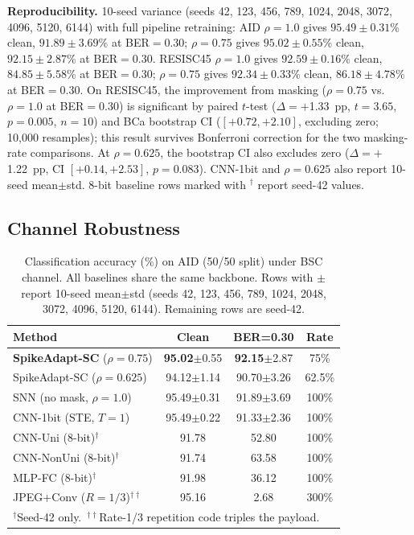 \documentclass[conference]{IEEEtran}
\begin{document}
\textbf{Reproducibility.} 10-seed variance (seeds 42, 123, 456, 789, 1024, 2048, 3072, 4096, 5120, 6144) with full pipeline retraining: AID $\rho{=}1.0$ gives $95.49 \pm 0.31$\% clean, $91.89 \pm 3.69$\% at BER$=$0.30; $\rho{=}0.75$ gives $95.02 \pm 0.55$\% clean, $92.15 \pm 2.87$\% at BER$=$0.30. RESISC45 $\rho{=}1.0$ gives $92.59 \pm 0.16$\% clean, $84.85 \pm 5.58$\% at BER$=$0.30; $\rho{=}0.75$ gives $92.34 \pm 0.33$\% clean, $86.18 \pm 4.78$\% at BER$=$0.30. On RESISC45, the improvement from masking ($\rho{=}0.75$ vs.~$\rho{=}1.0$ at BER$=$0.30) is significant by paired $t$-test ($\Delta{=}+$1.33~pp, $t{=}3.65$, $p{=}0.005$, $n{=}10$) and BCa bootstrap CI ($[+0.72, +2.10]$, excluding zero; 10,000 resamples); this result survives Bonferroni correction for the two masking-rate comparisons. At $\rho{=}0.625$, the bootstrap CI also excludes zero ($\Delta{=}+$1.22~pp, CI $[+0.14, +2.53]$, $p{=}0.083$). CNN-1bit and $\rho{=}0.625$ also report 10-seed mean$\pm$std. 8-bit baseline rows marked with $^\dagger$ report seed-42 values.

\subsection{Channel Robustness}

\begin{table}[t]
\renewcommand{\arraystretch}{1.15}
\centering
\caption{Classification accuracy (\%) on AID (50/50 split) under BSC channel. All baselines share the same backbone. Rows with $\pm$ report 10-seed mean$\pm$std (seeds 42, 123, 456, 789, 1024, 2048, 3072, 4096, 5120, 6144). Remaining rows are seed-42.}
\label{tab:main_results}
\begin{tabular}{l c c c}
\toprule
\textbf{Method} & \textbf{Clean} & \textbf{BER=0.30} & \textbf{Rate} \\
\midrule
\textbf{SpikeAdapt-SC} ($\rho{=}0.75$) & \textbf{95.02}{\scriptsize$\pm$0.55} & \textbf{92.15}{\scriptsize$\pm$2.87} & 75\% \\
SpikeAdapt-SC ($\rho{=}0.625$) & 94.12{\scriptsize$\pm$1.14} & 90.70{\scriptsize$\pm$3.26} & 62.5\% \\
SNN (no mask, $\rho{=}1.0$) & 95.49{\scriptsize$\pm$0.31} & 91.89{\scriptsize$\pm$3.69} & 100\% \\
CNN-1bit (STE, $T{=}1$) & 95.49{\scriptsize$\pm$0.22} & 91.33{\scriptsize$\pm$2.36} & 100\% \\
\midrule
CNN-Uni (8-bit)$^\dagger$ & 91.78 & 52.80 & 100\% \\
CNN-NonUni (8-bit)$^\dagger$ & 91.74 & 63.58 & 100\% \\
MLP-FC (8-bit)$^\dagger$ & 91.98 & 36.12 & 100\% \\
JPEG+Conv ($R{=}1/3$)$^{\dagger\dagger}$ & 95.16 & 2.68 & 300\% \\
\bottomrule
\multicolumn{4}{l}{\scriptsize $^\dagger$Seed-42 only.~$^{\dagger\dagger}$Rate-1/3 repetition code triples the payload.}
\end{tabular}
\end{table}
\end{document}
